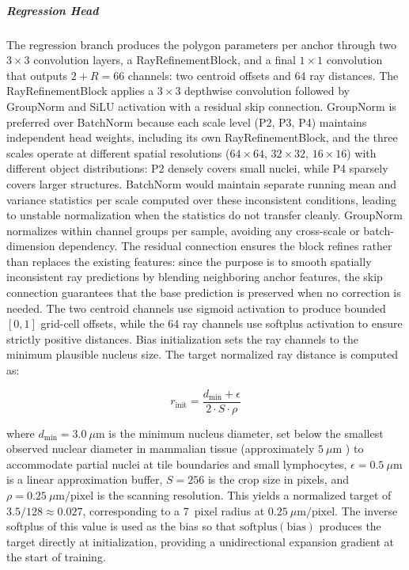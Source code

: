 \subparagraph{Regression Head}

The regression branch produces the polygon parameters per anchor through two $3 \times 3$ convolution layers, a RayRefinementBlock, and a final $1 \times 1$ convolution that outputs $2 + R = 66$ channels: two centroid offsets and 64 ray distances. The RayRefinementBlock applies a $3 \times 3$ depthwise convolution followed by GroupNorm and SiLU activation with a residual skip connection. GroupNorm is preferred over BatchNorm because each scale level (P2, P3, P4) maintains independent head weights, including its own RayRefinementBlock, and the three scales operate at different spatial resolutions ($64 \times 64$, $32 \times 32$, $16 \times 16$) with different object distributions: P2 densely covers small nuclei, while P4 sparsely covers larger structures. BatchNorm would maintain separate running mean and variance statistics per scale computed over these inconsistent conditions, leading to unstable normalization when the statistics do not transfer cleanly. GroupNorm normalizes within channel groups per sample, avoiding any cross-scale or batch-dimension dependency. The residual connection ensures the block refines rather than replaces the existing features: since the purpose is to smooth spatially inconsistent ray predictions by blending neighboring anchor features, the skip connection guarantees that the base prediction is preserved when no correction is needed. The two centroid channels use sigmoid activation to produce bounded $[0, 1]$ grid-cell offsets, while the 64 ray channels use softplus activation to ensure strictly positive distances. Bias initialization sets the ray channels to the minimum plausible nucleus size. The target normalized ray distance is computed as:

\begin{equation}
	r_{\text{init}} = \frac{d_{\min} + \epsilon}{2 \cdot S \cdot \rho}
\end{equation}

where $d_{\min} = 3.0~\mu\text{m}$ is the minimum nucleus diameter, set below the smallest observed nuclear diameter in mammalian tissue (approximately $5~\mu\text{m}$ \cite{lammerding2011mechanics}) to accommodate partial nuclei at tile boundaries and small lymphocytes, $\epsilon = 0.5~\mu\text{m}$ is a linear approximation buffer, $S = 256$ is the crop size in pixels, and $\rho = 0.25~\mu\text{m/pixel}$ is the scanning resolution. This yields a normalized target of $3.5 / 128 \approx 0.027$, corresponding to a 7~pixel radius at $0.25~\mu\text{m/pixel}$. The inverse softplus of this value is used as the bias so that $\text{softplus}(\text{bias})$ produces the target directly at initialization, providing a unidirectional expansion gradient at the start of training.

